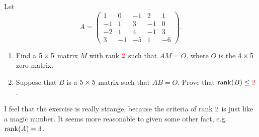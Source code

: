\begin{exercise} \label{exercise 3.2.20}
Let
\[
    A = \begin{pmatrix}
        1 & 0 & -1 & 2 & 1 \\
        -1 & 1 & 3 & -1 & 0 \\
        -2 & 1 & 4 & -1 & 3 \\
        3 & -1 & -5 & 1 & -6
    \end{pmatrix}.
\]
\begin{enumerate}
\item Find a \(5 \times 5\) matrix \(M\) with rank \(\RED{2}\) such that \(AM = O\), where \(O\) is the \(4 \times 5\) zero matrix.

\item Suppose that \(B\) is a \(5 \times 5\) matrix such that \(AB = O\).
Prove that \(\rank(B) \le \RED{2}\).
\end{enumerate}
\end{exercise}

\begin{note}
I feel that the exercise is really strange, because the criteria of rank \(\RED{2}\) is just like a magic number.
It seems more reasonable to given some other fact, e.g. \(\mathrm{rank}(A) = 3\).
\end{note}

